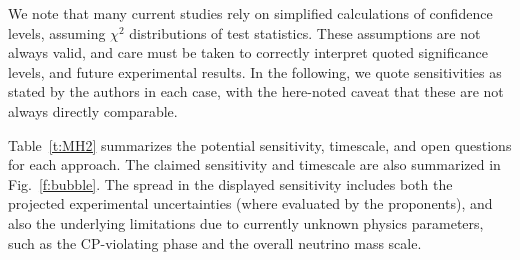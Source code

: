 We note that many current studies rely on simplified calculations of confidence levels, assuming $\chi^2$ distributions of test statistics. These assumptions are not always valid, and care must be taken to correctly interpret quoted significance levels, and future experimental results.  In the following, we quote sensitivities as stated by the authors in each case, with the here-noted caveat that these are not always directly comparable.


Table~\ref{t:MH2} summarizes the potential sensitivity, timescale, and open questions for each approach.
The claimed sensitivity and timescale are also summarized in Fig.~\ref{f:bubble}.  The spread in the displayed sensitivity includes both the projected experimental uncertainties (where evaluated by the proponents), and also the underlying limitations due to currently unknown physics parameters, such as the CP-violating phase and the overall neutrino mass scale.


